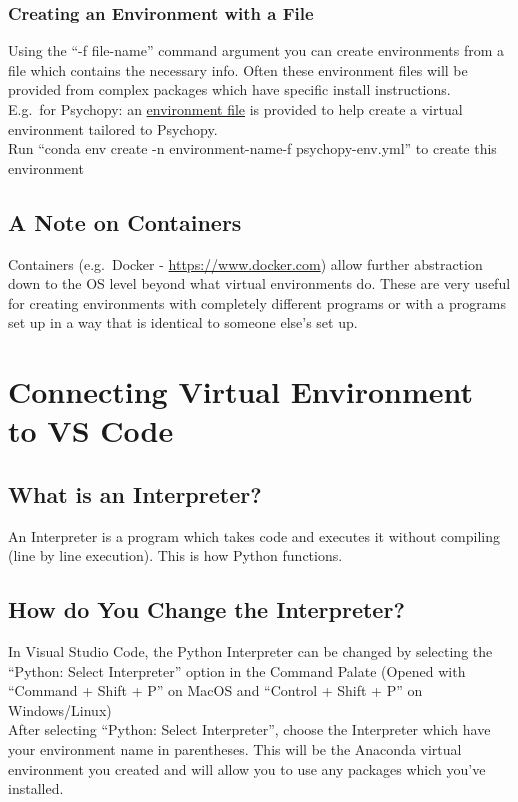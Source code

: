 \documentclass[12pt]{article}
\begin{document}
            \subsubsection{Creating an Environment with a File}
                Using the ``-f \textlangle file-name\textrangle'' command argument you can create environments from a file which contains the necessary info.
                Often these environment files will be provided from complex packages which have specific install instructions.
                \\E.g.\ for Psychopy: an \href{https://raw.githubusercontent.com/psychopy/psychopy/master/conda/psychopy-env.yml}{environment file} is provided to help create a virtual environment tailored to Psychopy.
                \\Run ``conda env create -n \textlangle environment-name\textrangle -f psychopy-env.yml'' to create this environment
        \subsection{A Note on Containers}
            Containers (e.g.\ Docker - \url{https://www.docker.com}) allow further abstraction down to the OS level beyond what virtual environments do.
            These are very useful for creating environments with completely different programs or with a programs set up in a way that is identical to someone else's set up.
    \section{Connecting Virtual Environment to VS Code}
        \subsection{What is an Interpreter?}
            An Interpreter is a program which takes code and executes it without compiling (line by line execution). This is how Python functions.
        \subsection{How do You Change the Interpreter?}
            In Visual Studio Code, the Python Interpreter can be changed by selecting the ``Python: Select Interpreter'' option in the Command Palate (Opened with ``Command + Shift + P'' on MacOS and ``Control + Shift + P'' on Windows/Linux)
            \\After selecting ``Python: Select Interpreter'', choose the Interpreter which have your environment name in parentheses. This will be the Anaconda virtual environment you created and will allow you to use any packages which you've installed.
\end{document}
